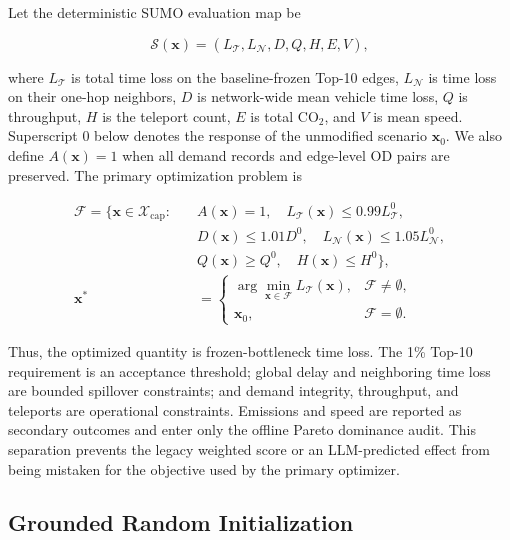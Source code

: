 Let the deterministic SUMO evaluation map be

\begin{equation}
\mathcal{S}(\mathbf{x})=
\left(L_{\mathcal{T}},L_{\mathcal{N}},D,Q,H,E,V\right),
\label{eq:simulator-response}
\end{equation}

where $L_{\mathcal{T}}$ is total time loss on the baseline-frozen Top-10 edges,
$L_{\mathcal{N}}$ is time loss on their one-hop neighbors, $D$ is network-wide
mean vehicle time loss, $Q$ is throughput, $H$ is the teleport count, $E$ is
total $\mathrm{CO}_2$, and $V$ is mean speed.  Superscript $0$ below denotes
the response of the unmodified scenario $\mathbf{x}_0$.  We also define
$A(\mathbf{x})=1$ when all demand records and edge-level OD pairs are
preserved.  The primary optimization problem is

\begin{equation}
\begin{aligned}
\mathcal{F}=\{\mathbf{x}\in\mathcal{X}_{\mathrm{cap}}:\quad
&A(\mathbf{x})=1,\quad
L_{\mathcal{T}}(\mathbf{x})\leq0.99L_{\mathcal{T}}^0,\\
&D(\mathbf{x})\leq1.01D^0,\quad
L_{\mathcal{N}}(\mathbf{x})\leq1.05L_{\mathcal{N}}^0,\\
&Q(\mathbf{x})\geq Q^0,\quad H(\mathbf{x})\leq H^0\},\\
\mathbf{x}^*&=
\begin{cases}
\arg\min_{\mathbf{x}\in\mathcal{F}}L_{\mathcal{T}}(\mathbf{x}),
&\mathcal{F}\neq\emptyset,\\
\mathbf{x}_0,&\mathcal{F}=\emptyset.
\end{cases}
\end{aligned}
\label{eq:top10-constrained-selection}
\end{equation}

Thus, the optimized quantity is frozen-bottleneck time loss.  The 1\% Top-10
requirement is an acceptance threshold; global delay and neighboring time loss
are bounded spillover constraints; and demand integrity, throughput, and
teleports are operational constraints.  Emissions and speed are reported as
secondary outcomes and enter only the offline Pareto dominance audit.
This separation prevents the legacy weighted score or an LLM-predicted effect
from being mistaken for the objective used by the primary optimizer.

\subsection{Grounded Random Initialization}
\label{sec:grounded-proposals}

